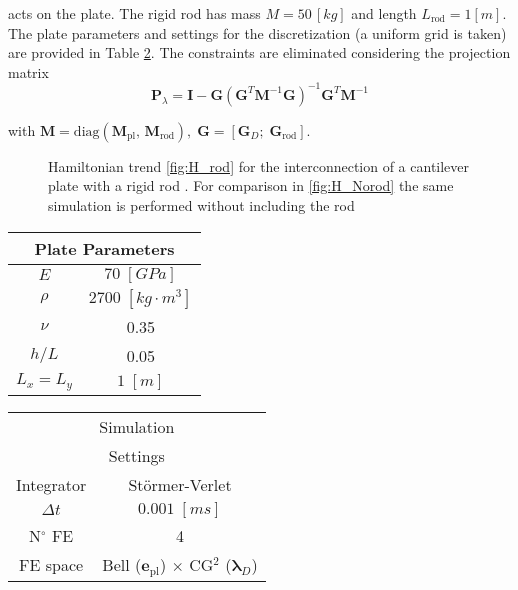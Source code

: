 \documentclass[letterpaper, 10 pt, conference]{ieeeconf}
\begin{document}
acts on the plate. The rigid rod has mass $M = 50 \, [kg]$ and length $L_{\text{rod}} = 1 [m]$. The plate parameters and settings for the discretization (a uniform grid is taken) are provided in Table \ref{tab:par}. The constraints are eliminated considering the projection matrix \cite{Heiland_red}
\begin{equation} \label{eq:proj}
\bm{P}_{\lambda} = \bm{I} - \bm{G} \left(\bm{G}^T \bm{M}^{-1} \bm{G} \right)^{-1} \bm{G}^T \bm{M}^{-1}
\end{equation}
 
with $\bm{M} = \text{diag}(\bm{M}_{\text{pl}}, \, \bm{M}_{\text{rod}}), \; \bm{G} = [\bm{G}_D; \; \bm{G}_{\text{rod}}]$.

\begin{figure}[t]
\centering
{}
\hfil
{}
\caption{Hamiltonian trend \ref{fig:H_rod} for the interconnection of a cantilever plate with a rigid rod . For comparison in \ref{fig:H_Norod} the same simulation is performed without including the rod}
\label{fig:HamInt}
\end{figure}
\begin{table}[t]
	\centering
	\begin{tabular}{|c|c|}
		\hline 
		\multicolumn{2}{|c|}{Plate Parameters} \\ 
		\hline 
		$E$ & $70\; [GPa]$ \\ 
		$\rho$ & $2700\; [kg \cdot m^3]$ \\ 
		$\nu$& 0.35 \\ 
		$h/L$& 0.05 \\ 
		$L_x = L_y$& $1\; [m]$\\ 
		\hline 
	\end{tabular} 
	\begin{tabular}{|c|c|}
		\hline 
		\multicolumn{2}{|c|}{Simulation} \\ 
		\multicolumn{2}{|c|}{Settings} \\
		\hline 
		Integrator & St\"ormer-Verlet \\
		$\Delta t $ & $0.001 \; [ms]$ \\  
		N$^\circ$ FE & 4 \\
		FE space & Bell ($\bm{e}_{\text{pl}}$) $\times$ CG$^2$ ($\bm{\lambda}_D$)\\
		\hline 
	\end{tabular} 
	\captionsetup{width=0.95\linewidth}
	\vspace{1mm}
	\label{tab:par}
\end{table}
\end{document}
